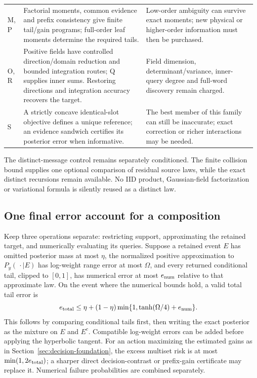 \documentclass[10pt,a4paper]{article}
\begin{document}
\begin{center}
\begin{tabularx}{\textwidth}{@{}p{}YY@{}}
M, P & Factorial moments, common evidence and prefix consistency give finite tail/gain programs; full-order leaf moments determine the required tails. &
Low-order ambiguity can survive exact moments; new physical or higher-order information must then be purchased.\\
O, R & Positive fields have controlled direction/domain reduction and bounded integration routes; Q supplies inner sums. Restoring directions and integration accuracy recovers the target. &
Field dimension, determinant/variance, inner-query degree and full-word discovery remain charged.\\
S & A strictly concave identical-slot objective defines a unique reference; an evidence sandwich certifies its posterior error when informative. &
The best member of this family can still be inaccurate; exact correction or richer interactions may be needed.\\
\bottomrule
\end{tabularx}
\end{center}

The distinct-message control remains separately conditioned. The finite collision bound supplies one
optional comparison of residual source laws, while the exact distinct recursions remain available.
No IID product, Gaussian-field factorization or variational formula is silently reused as a distinct law.

\subsection{One final error account for a composition}
Keep three operations separate: restricting support, approximating the retained target, and numerically
evaluating its queries. Suppose a retained event $E$ has omitted posterior mass at most $\eta$,
the normalized positive approximation to $P_y(\,\cdot\mid E)$ has log-weight range error at most $\Omega$,
and every returned conditional tail, clipped to $[0,1]$, has numerical error at most $e_{\rm num}$
relative to that approximate law. On the event where the numerical bounds hold, a valid total tail error is
\begin{equation}
 e_{\rm total}\leq
 \eta+(1-\eta)\min\{1,\tanh(\Omega/4)+e_{\rm num}\}.
 \label{eq:completion-error-ledger}
\end{equation}
This follows by comparing conditional tails first, then writing the exact posterior as the mixture
on $E$ and $E^c$. Compatible log-weight errors can be added before applying the hyperbolic tangent.
For an action maximizing the estimated gains as in Section~\ref{sec:decision-foundation}, the excess
multiset risk is at most $\min(1,2e_{\rm total})$; a sharper direct decision-contrast or prefix-gain
certificate may replace it. Numerical failure probabilities are combined separately.
\end{document}
